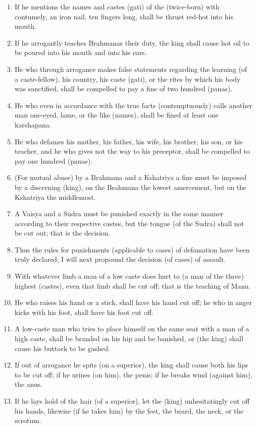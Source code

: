\begin{enumerate}
\item If he mentions the names and castes (gati) of the (twice-born) with contumely, an iron nail, ten fingers long, shall be thrust red-hot into his mouth.
\item If he arrogantly teaches Brahmanas their duty, the king shall cause hot oil to be poured into his mouth and into his ears.
\item He who through arrogance makes false statements regarding the learning (of a caste-fellow), his country, his caste (gati), or the rites by which his body was sanctified, shall be compelled to pay a fine of two hundred (panas).
\item He who even in accordance with the true facts (contemptuously) calls another man one-eyed, lame, or the like (names), shall be fined at least one karshapana.
\item He who defames his mother, his father, his wife, his brother, his son, or his teacher, and he who gives not the way to his preceptor, shall be compelled to pay one hundred (panas).
\item (For mutual abuse) by a Brahmana and a Kshatriya a fine must be imposed by a discerning (king), on the Brahmana the lowest amercement, but on the Kshatriya the middlemost.
\item A Vaisya and a Sudra must be punished exactly in the same manner according to their respective castes, but the tongue (of the Sudra) shall not be cut out; that is the decision.
\item Thus the rules for punishments (applicable to cases) of defamation have been truly declared; I will next propound the decision (of cases) of assault.
\item With whatever limb a man of a low caste does hurt to (a man of the three) highest (castes), even that limb shall be cut off; that is the teaching of Manu.
\item He who raises his hand or a stick, shall have his hand cut off; he who in anger kicks with his foot, shall have his foot cut off.
\item A low-caste man who tries to place himself on the same seat with a man of a high caste, shall be branded on his hip and be banished, or (the king) shall cause his buttock to be gashed.
\item If out of arrogance he spits (on a superior), the king shall cause both his lips to be cut off; if he urines (on him), the penis; if he breaks wind (against him), the anus.
\item If he lays hold of the hair (of a superior), let the (king) unhesitatingly cut off his hands, likewise (if he takes him) by the feet, the beard, the neck, or the scrotum.

\end{enumerate}

